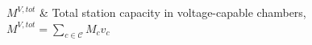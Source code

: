 
\(M^{V,tot}\) & Total station capacity in voltage-capable chambers,
\(M^{V,tot}=\sum_{c\in\mathcal{C}}M_cv_c\) \\ \hline
